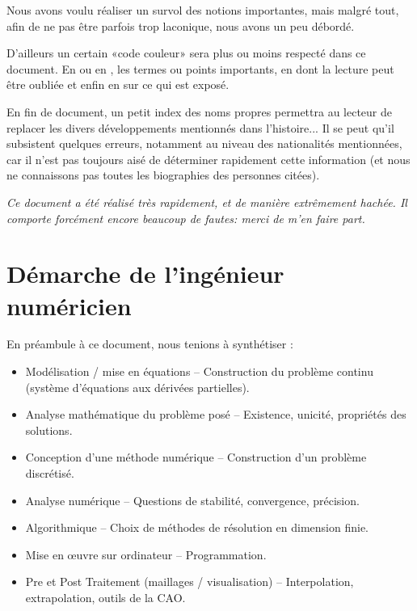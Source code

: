 \documentclass[11pt,pdflatex]{book}
\begin{document}
Nous avons voulu réaliser un survol des notions importantes, mais malgré tout, afin de ne pas être parfois trop laconique, nous avons un peu débordé. \ifVersionDuDocEstVincent{}\fi

\medskip
\ifVersionDuDocEstVincent
D'ailleurs un certain «code couleur» sera plus ou moins respecté dans ce document. En  ou en , les termes ou points importants, en  dont la lecture peut être oubliée et enfin en  sur ce qui est exposé.
\fi

\medskip
En fin de document, un petit index des noms propres permettra au lecteur de replacer les divers développements mentionnés dans l'histoire...
Il se peut qu'il subsistent quelques erreurs, notamment au niveau des nationalités mentionnées, car il n'est pas toujours aisé de déterminer rapidement cette information (et nous ne connaissons pas toutes les biographies des personnes citées).

\medskip
\emph{Ce document a été réalisé très rapidement, et de manière extrêmement hachée. Il comporte forcément encore beaucoup de fautes: merci de m'en faire part.}




\bigskip
\section*{Démarche de l'ingénieur numéricien}

En préambule à ce document, nous tenions à synthétiser :
\begin{itemize}
   \item Modélisation / mise en équations -- Construction du problème continu (système d'équations aux dérivées partielles).
   \item Analyse mathématique du problème posé -- Existence, unicité, propriétés des solutions.
   \item Conception d'une méthode numérique -- Construction d'un problème discrétisé.
   \item Analyse numérique -- Questions de stabilité, convergence, précision.
   \item Algorithmique -- Choix de méthodes de résolution en dimension finie.
   \item Mise en œuvre sur ordinateur -- Programmation.
   \item Pre et Post Traitement (maillages / visualisation) -- Interpolation, extrapolation, outils de la CAO.
\end{itemize}
\end{document}
